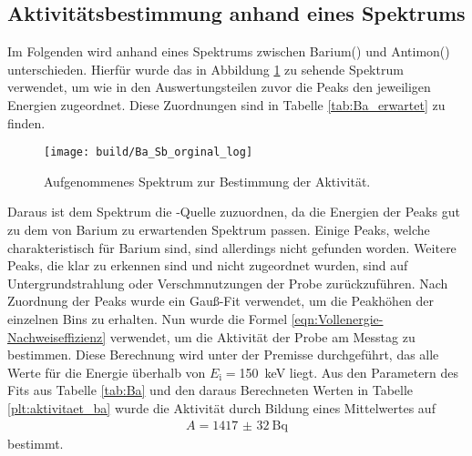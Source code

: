 \subsection{Aktivitätsbestimmung anhand eines Spektrums}
\label{sec:Aktivitätsbestimmung}
Im Folgenden wird anhand eines Spektrums zwischen Barium() und Antimon()
unterschieden. Hierfür wurde das in Abbildung \ref{plt:bar} zu sehende
Spektrum verwendet, um wie in den Auswertungsteilen zuvor die Peaks den jeweiligen
Energien zugeordnet. Diese Zuordnungen sind in Tabelle \ref{tab:Ba_erwartet} zu
finden.
\begin{figure}[htb]
  \centering
  \texttt{[image: build/Ba\_Sb\_orginal\_log]}
  \caption{Aufgenommenes Spektrum zur Bestimmung der Aktivität.}
  \label{plt:bar}
\end{figure}

\FloatBarrier
Daraus ist dem Spektrum die -Quelle zuzuordnen, da die Energien der
Peaks gut zu dem von Barium zu erwartenden Spektrum passen. Einige Peaks, welche
charakteristisch für Barium sind, sind allerdings nicht gefunden worden.
Weitere Peaks, die klar zu erkennen sind und nicht zugeordnet wurden, sind auf
Untergrundstrahlung oder Verschmnutzungen der Probe zurückzuführen. Nach
Zuordnung der Peaks wurde ein Gauß-Fit verwendet, um die Peakhöhen der einzelnen
Bins zu erhalten. Nun wurde die Formel \eqref{eqn:Vollenergie-Nachweiseffizienz}
verwendet, um die Aktivität der Probe am Messtag zu bestimmen. Diese Berechnung
wird unter der Premisse durchgeführt, das alle Werte für die Energie überhalb
von $E_\text{i} = $\SI{150}{\kilo\electronvolt} liegt. Aus den Parametern des
Fits aus Tabelle \ref{tab:Ba} und den daraus Berechneten Werten in Tabelle
\ref{plt:aktivitaet_ba} wurde die Aktivität durch Bildung eines Mittelwertes
auf
\begin{align*}
  A = \SI{1417(32)}{\becquerel}
\end{align*}
bestimmt.

\FloatBarrier

